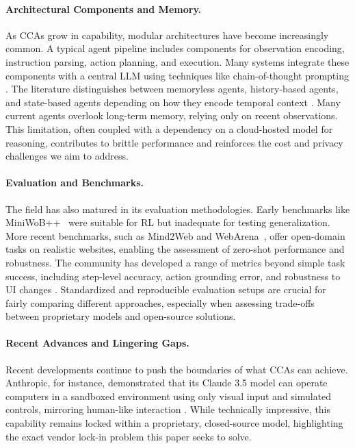 \documentclass[runningheads]{llncs}
\begin{document}
\paragraph{Architectural Components and Memory.}
As CCAs grow in capability, modular architectures have become increasingly common. A typical agent pipeline includes components for observation encoding, instruction parsing, action planning, and execution. Many systems integrate these components with a central LLM using techniques like chain-of-thought prompting \cite{yao2022react}. The literature distinguishes between memoryless agents, history-based agents, and state-based agents depending on how they encode temporal context \cite{sager2025review}. Many current agents overlook long-term memory, relying only on recent observations. This limitation, often coupled with a dependency on a cloud-hosted model for reasoning, contributes to brittle performance and reinforces the cost and privacy challenges we aim to address.

\paragraph{Evaluation and Benchmarks.}
The field has also matured in its evaluation methodologies. Early benchmarks like MiniWoB++~\cite{shi2017world} were suitable for RL but inadequate for testing generalization. More recent benchmarks, such as Mind2Web and WebArena~\cite{liu2023webarena}, offer open-domain tasks on realistic websites, enabling the assessment of zero-shot performance and robustness. The community has developed a range of metrics beyond simple task success, including step-level accuracy, action grounding error, and robustness to UI changes \cite{sager2025review}. Standardized and reproducible evaluation setups are crucial for fairly comparing different approaches, especially when assessing trade-offs between proprietary models and open-source solutions.

\paragraph{Recent Advances and Lingering Gaps.}
Recent developments continue to push the boundaries of what CCAs can achieve. Anthropic, for instance, demonstrated that its Claude 3.5 model can operate computers in a sandboxed environment using only visual input and simulated controls, mirroring human-like interaction \cite{claude2024computeruse}. While technically impressive, this capability remains locked within a proprietary, closed-source model, highlighting the exact vendor lock-in problem this paper seeks to solve.
\end{document}
